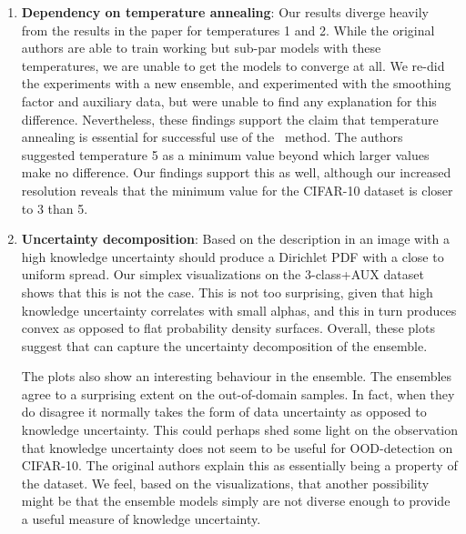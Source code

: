 \begin{enumerate}
    \item \textbf{Dependency on temperature annealing}: Our results diverge heavily from the results in the paper for temperatures 1 and 2. While the original authors are able to train working but sub-par models with these temperatures, we are unable to get the models to converge at all. We re-did the experiments with a new ensemble, and experimented with the smoothing factor and auxiliary data, but were unable to find any explanation for this difference. Nevertheless, these findings support the claim that temperature annealing is essential for successful use of the \EnDD \ method. The authors suggested temperature 5 as a minimum value beyond which larger values make no difference. Our findings support this as well, although our increased resolution reveals that the minimum value for the CIFAR-10 dataset is closer to 3 than 5. 
    
    \item \textbf{Uncertainty decomposition}: Based on the description in \cite{NIPS2018_7936} an image with a high knowledge uncertainty should produce a Dirichlet PDF with a close to uniform spread. Our simplex visualizations on the 3-class+AUX dataset shows that this is not the case. This is not too surprising, given that high knowledge uncertainty correlates with small alphas, and this in turn produces convex as opposed to flat probability density surfaces. Overall, these plots suggest that \EnDD  can capture the uncertainty decomposition of the ensemble.
    
    The plots also show an interesting behaviour in the ensemble. The ensembles agree to a surprising extent on the out-of-domain samples. In fact, when they do disagree it normally takes the form of data uncertainty as opposed to knowledge uncertainty. This could perhaps shed some light on the observation that knowledge uncertainty does not seem to be useful for OOD-detection on CIFAR-10. The original authors explain this as essentially being a property of the dataset. We feel, based on the visualizations, that another possibility might be that the ensemble models simply are not diverse enough to provide a useful measure of knowledge uncertainty. 
    
    
    
    
    
\end{enumerate}

